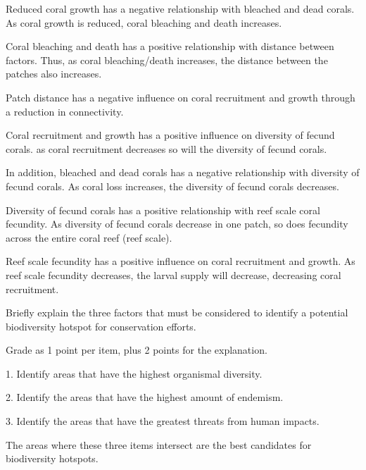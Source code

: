 \documentclass[11pt]{exam}
\begin{document}
\begin{questions}
\begin{solution}
Reduced coral growth has a negative relationship with bleached and dead corals. As coral growth is reduced, coral bleaching and death increases.  

Coral bleaching and death has a positive relationship with distance between factors. Thus, as coral bleaching/death increases, the distance between the patches also increases.

Patch distance has a negative influence on coral recruitment and growth through a reduction in connectivity.

Coral recruitment and growth has a positive influence on diversity of fecund corals. as coral recruitment decreases so will the diversity of fecund corals. 

In addition, bleached and dead corals has a negative relationship with diversity of fecund corals. As coral loss increases, the diversity of fecund corals decreases. 

Diversity of fecund corals has a positive relationship with reef scale coral fecundity. As diversity of fecund corals decrease in one patch, so does fecundity across the entire coral reef (reef scale).

Reef scale fecundity has a positive influence on coral recruitment and growth. As reef scale fecundity decreases, the larval supply will decrease, decreasing coral recruitment.

\end{solution}


\newpage

\question[5]
Briefly explain the three factors that must be considered to identify
a potential biodiversity hotspot for conservation efforts.

\begin{minipage}[t][3in]{0.95\textwidth}%
\begin{solution}
Grade as 1 point per item, plus 2 points for the explanation.\vspace{\baselineskip}

1. Identify areas that have the highest organismal diversity.

2. Identify the areas that have the highest amount of endemism.

3. Identify the areas that have the greatest threats from human impacts.

The areas where these three items intersect are the best candidates for biodiversity hotspots.
\end{solution}
\end{minipage}
 

\end{questions}
\end{document}
